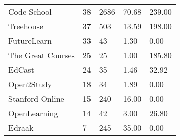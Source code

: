 \documentclass[
	a4paper,
	pdftex,
	12pt,	
	footinclude=true,
	fleqn,
	final,
	]{report}%
\begin{document}
\begin{table}[h]
{\begin{tabular}{m{7cm} m{2.3cm} m{2.3cm} m{2.3cm} m{2.3cm}}
Code School                   & 38                                                   & 2686                                                  & 70.68                                                    & 239.00                                                   \\
Treehouse                     & 37                                                   & 503                                                   & 13.59                                                    & 198.00                                                   \\
FutureLearn                   & 33                                                   & 43                                                    & 1.30                                                     & 0.00                                                     \\
The Great Courses             & 25                                                   & 25                                                    & 1.00                                                     & 185.80                                                   \\
EdCast                        & 24                                                   & 35                                                    & 1.46                                                     & 32.92                                                    \\
Open2Study                    & 18                                                   & 34                                                    & 1.89                                                     & 0.00                                                     \\
Stanford Online               & 15                                                   & 240                                                   & 16.00                                                    & 0.00                                                     \\
OpenLearning                  & 14                                                   & 42                                                    & 3.00                                                     & 26.80                                                    \\
Edraak                        & 7                                                    & 245                                                   & 35.00                                                    & 0.00                                                     \\

\end{tabular}}
\end{table}
\end{document}
